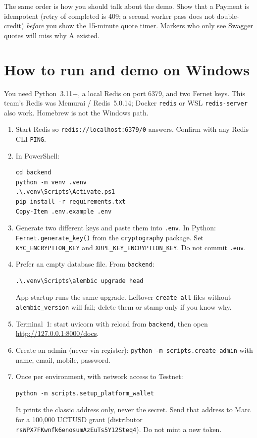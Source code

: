 \documentclass[11pt]{article}
\begin{document}
The same order is how you should talk about the demo. Show that a Payment is idempotent (retry of completed is 409; a second worker pass does not double-credit) \emph{before} you show the 15-minute quote timer. Markers who only see Swagger quotes will miss why A existed.

\newpage
\section{How to run and demo on Windows}
You need Python~3.11+, a local Redis on port 6379, and two Fernet keys. This team's Redis was Memurai / Redis~5.0.14; Docker \texttt{redis} or WSL \texttt{redis-server} also work. Homebrew is not the Windows path.

\begin{enumerate}
  \item Start Redis so \texttt{redis://localhost:6379/0} answers. Confirm with any Redis CLI \texttt{PING}.
  \item In PowerShell:
\begin{verbatim}
cd backend
python -m venv .venv
.\.venv\Scripts\Activate.ps1
pip install -r requirements.txt
Copy-Item .env.example .env
\end{verbatim}
  \item Generate two different keys and paste them into \texttt{.env}. In Python:
        \texttt{Fernet.generate\_key()} from the \texttt{cryptography} package.
        Set \texttt{KYC\_ENCRYPTION\_KEY} and \texttt{XRPL\_KEY\_ENCRYPTION\_KEY}. Do not commit \texttt{.env}.
  \item Prefer an empty database file. From \texttt{backend}:
\begin{verbatim}
.\.venv\Scripts\alembic upgrade head
\end{verbatim}
  App startup runs the same upgrade. Leftover \texttt{create\_all} files without \texttt{alembic\_version} will fail; delete them or stamp only if you know why.
  \item Terminal~1: start uvicorn with reload from \texttt{backend}, then open
        \url{http://127.0.0.1:8000/docs}.
  \item Create an admin (never via register):
        \texttt{python -m scripts.create\_admin} with name, email, mobile, password.
  \item Once per environment, with network access to Testnet:
\begin{verbatim}
python -m scripts.setup_platform_wallet
\end{verbatim}
  It prints the classic address only, never the secret. Send that address to Marc for a 100{,}000 UCTUSD grant (distributor \texttt{rsWPX7FKwnfk6enosumAzEuTs5Y12Steq4}). Do not mint a new token.

\end{enumerate}
\end{document}
